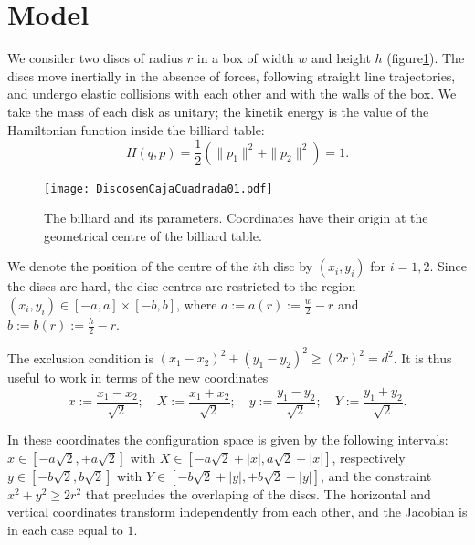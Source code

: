 \documentclass[letterpaper,10pt, jcp, aps]{revtex4-1}
\newcommand{\defeq}{:=}
\begin{document}
\section{Model}


We consider two discs of radius $r$  %
in a box of width $w$ and height $h$ (figure\ref{billar01}). 
The discs move inertially in the absence of forces, 
following straight line trajectories,
and undergo elastic collisions with each 
other and with the walls of the box.
We take the mass of each disk as unitary; the kinetik energy
is the value of the Hamiltonian function inside the billiard table:
\begin{equation}
H(q,p)=\frac{1}{2}(\|p_1\|^2+\|p_2\|^2)=1.
\end{equation}

\begin{figure}[h]
  \begin{center}
  \texttt{[image: DiscosenCajaCuadrada01.pdf]}
  \end{center}
  \caption{The billiard and its parameters. Coordinates
    have their origin at the geometrical centre of the 
    billiard table.}\label{billar01}
\end{figure}

We denote the position of the centre of the $i$th disc by 
$(x_{i}, y_{i})$ for $i=1,2$. Since the discs are hard, 
the disc centres are restricted to the region 
$(x_i, y_i) \in [-a,a] \times [-b, b]$, where 
$a \defeq a(r) \defeq \frac{w}{2} - r $ and
$b \defeq b(r) \defeq \frac{h}{2} - r $.


The exclusion condition is $(x_1-x_2)^2 + (y_1-y_2)^2 \ge (2r)^2 = d^2$.
It is thus useful to work in terms of the new coordinates
\begin{equation}\label{cambiocoor01}
 x \defeq \frac{x_1 - x_2}{\sqrt{2}}; 
\quad X \defeq \frac{x_1 + x_2}{\sqrt{2}}; 
\quad y \defeq \frac{y_1 - y_2}{\sqrt{2}}; 
\quad Y \defeq \frac{y_1 + y_2}{\sqrt{2}}.
\end{equation}

In these coordinates the configuration space is given by the following
intervals:
$x \in [-a \sqrt{2}, +a \sqrt{2}]$ with 
$X \in [-a \sqrt{2} + |x|, a \sqrt{2} - |x|]$, respectively 
 $y \in [-b \sqrt{2}, b \sqrt{2}]$ with $Y \in [-b \sqrt{2} + |y|, +b \sqrt{2} - |y|]$,  
and the constraint $x^2 + y^2 \ge 2 r^2$ that precludes the overlaping of
the discs.
The horizontal and vertical coordinates transform independently
from each other, and the Jacobian is in each case equal to $1$.
\end{document}
